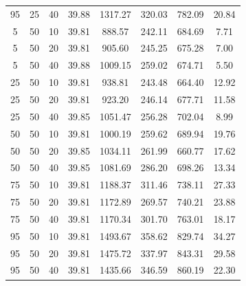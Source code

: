 \begin{table}[H]
\begin{tabular}{ccc|c|c|c|c|c}
95 & 25 & 40 & \cellcolor{gray!50}39.88 & \cellcolor{gray!1}1317.27 & \cellcolor{gray!1}320.03 & \cellcolor{gray!13}782.09 & 20.84\\
5 & 50 & 10 & \cellcolor{gray!50}39.81 & \cellcolor{gray!23}888.57 & \cellcolor{gray!1}242.11 & \cellcolor{gray!43}684.69 & 7.71\\
5 & 50 & 20 & \cellcolor{gray!50}39.81 & \cellcolor{gray!21}905.60 & \cellcolor{gray!1}245.25 & \cellcolor{gray!46}675.28 & 7.00\\
5 & 50 & 40 & \cellcolor{gray!50}39.88 & \cellcolor{gray!3}1009.15 & \cellcolor{gray!1}259.02 & \cellcolor{gray!46}674.71 & 5.50\\
25 & 50 & 10 & \cellcolor{gray!50}39.81 & \cellcolor{gray!15}938.81 & \cellcolor{gray!1}243.48 & \cellcolor{gray!49}664.40 & 12.92\\
25 & 50 & 20 & \cellcolor{gray!50}39.81 & \cellcolor{gray!18}923.20 & \cellcolor{gray!1}246.14 & \cellcolor{gray!45}677.71 & 11.58\\
25 & 50 & 40 & \cellcolor{gray!50}39.85 & \cellcolor{gray!1}1051.47 & \cellcolor{gray!1}256.28 & \cellcolor{gray!38}702.04 & 8.99\\
50 & 50 & 10 & \cellcolor{gray!50}39.81 & \cellcolor{gray!5}1000.19 & \cellcolor{gray!1}259.62 & \cellcolor{gray!41}689.94 & 19.76\\
50 & 50 & 20 & \cellcolor{gray!50}39.85 & \cellcolor{gray!1}1034.11 & \cellcolor{gray!1}261.99 & \cellcolor{gray!50}660.77 & 17.62\\
50 & 50 & 40 & \cellcolor{gray!50}39.85 & \cellcolor{gray!1}1081.69 & \cellcolor{gray!1}286.20 & \cellcolor{gray!39}698.26 & 13.34\\
75 & 50 & 10 & \cellcolor{gray!50}39.81 & \cellcolor{gray!1}1188.37 & \cellcolor{gray!1}311.46 & \cellcolor{gray!26}738.11 & 27.33\\
75 & 50 & 20 & \cellcolor{gray!50}39.81 & \cellcolor{gray!1}1172.89 & \cellcolor{gray!1}269.57 & \cellcolor{gray!26}740.21 & 23.88\\
75 & 50 & 40 & \cellcolor{gray!50}39.81 & \cellcolor{gray!1}1170.34 & \cellcolor{gray!1}301.70 & \cellcolor{gray!19}763.01 & 18.17\\
95 & 50 & 10 & \cellcolor{gray!50}39.81 & \cellcolor{gray!1}1493.67 & \cellcolor{gray!1}358.62 & \cellcolor{gray!1}829.74 & 34.27\\
95 & 50 & 20 & \cellcolor{gray!50}39.81 & \cellcolor{gray!1}1475.72 & \cellcolor{gray!1}337.97 & \cellcolor{gray!1}843.31 & 29.58\\
95 & 50 & 40 & \cellcolor{gray!50}39.81 & \cellcolor{gray!1}1435.66 & \cellcolor{gray!1}346.59 & \cellcolor{gray!1}860.19 & 22.30\\

\end{tabular}
\end{table}
